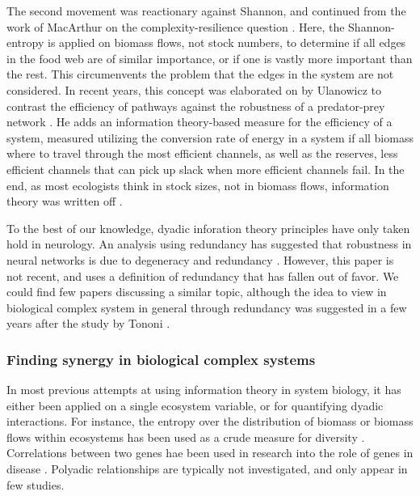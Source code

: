 \documentclass[../main.tex]{subfiles}
\begin{document}
The second movement was reactionary against Shannon, and continued from the work of MacArthur on the complexity-resilience question \cite{ulanowicz2009quantifying}.
Here, the Shannon-entropy is applied on biomass flows, not stock numbers, to determine if all edges in the food web are of similar importance, or if one is vastly more important than the rest.
This circumenvents the problem that the edges in the system are not considered.
In recent years, this concept was elaborated on by Ulanowicz to contrast the efficiency of pathways against the robustness of a predator-prey network \cite{ulanowicz2009quantifying}.
He adds an information theory-based measure for the efficiency of a system, measured utilizing the conversion rate of energy in a system if all biomass where to travel through the most efficient channels, as well as the reserves, less efficient channels that can pick up slack when more efficient channels fail.
In the end, as most ecologists think in stock sizes, not in biomass flows, information theory was written off \cite{ulanowicz2001information}.

To the best of our knowledge, dyadic inforation theory principles have only taken hold in neurology.
An analysis using redundancy has suggested that robustness in neural networks is due to degeneracy and redundancy \cite{tononi1999measures}.
However, this paper is not recent, and uses a definition of redundancy that has fallen out of favor.
We could find few papers discussing a similar topic, although the idea to view in biological complex system in general through redundancy was suggested in a few years after the study by Tononi \cite{edelman2001degeneracy}.

\subsubsection{Finding synergy in biological complex systems}

In most previous attempts at using information theory in system biology, it has either been applied on a single ecosystem variable, or for quantifying dyadic interactions.
For instance, the entropy over the distribution of biomass or biomass flows within ecosystems has been used as a crude measure for diversity \cite{ulanowicz2009quantifying}.
Correlations between two genes hae been used in research into the role of genes in disease \cite{lu2004gene}.
Polyadic relationships are typically not investigated, and only appear in few studies.
\end{document}
